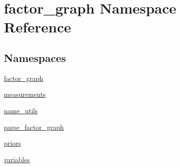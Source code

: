 \hypertarget{namespacefactor__graph}{}\section{factor\+\_\+graph Namespace Reference}
\label{namespacefactor__graph}
\subsection*{Namespaces}
\begin{DoxyCompactItemize}
\item
 \hyperlink{namespacefactor__graph_1_1factor__graph}{factor\+\_\+graph}
\item
 \hyperlink{namespacefactor__graph_1_1measurements}{measurements}
\item
 \hyperlink{namespacefactor__graph_1_1name__utils}{name\+\_\+utils}
\item
 \hyperlink{namespacefactor__graph_1_1parse__factor__graph}{parse\+\_\+factor\+\_\+graph}
\item
 \hyperlink{namespacefactor__graph_1_1priors}{priors}
\item
 \hyperlink{namespacefactor__graph_1_1variables}{variables}
\end{DoxyCompactItemize}
